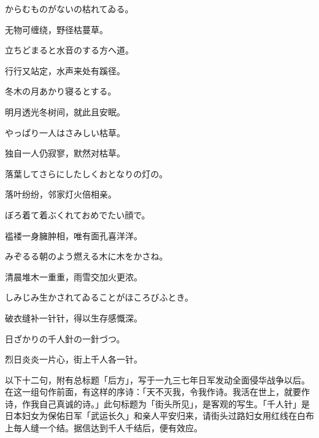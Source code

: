 \begin{haiku}
    {\FH からむものがないの枯れてゐる。}

    {\FK 无物可缠绕，野径枯蔓草。}
\end{haiku}

\begin{haiku}
    {\FH 立ちどまると水音のする方へ道。}

    {\FK 行行又站定，水声来处有蹊径。}
\end{haiku}

\begin{haiku}
    {\FH 冬木の月あかり寝るとする。}

    {\FK 明月透光冬树间，就此且安眠。}
\end{haiku}

\begin{haiku}
    {\FH やっぱり一人はさみしい枯草。}

    {\FK 独自一人仍寂寥，默然对枯草。}
\end{haiku}

\begin{haiku}
    {\FH 落葉してさらにしたしくおとなりの灯の。}

    {\FK 落叶纷纷，邻家灯火倍相亲。}
\end{haiku}

\begin{haiku}
    {\FH ぼろ着て着ぶくれておめでたい顔で。}

    {\FK 褴褛一身臃肿相，唯有面孔喜洋洋。}
\end{haiku}

\begin{haiku}
    {\FH みぞるる朝のよう燃える木に木をかさね。}

    {\FK 清晨堆木一重重，雨雪交加火更浓。}
\end{haiku}

\begin{haiku}
    {\FH しみじみ生かされてゐることがほころびふとき。}

    {\FK 破衣缝补一针针，得以生存感慨深。}
\end{haiku}

\begin{haiku}
    {\FH 日ざかりの千人針の一針づつ。}

    {\FK 烈日炎炎一片心，街上千人各一针。}

    {\FS 以下十二句，附有总标题「后方」，写于一九三七年日军发动全面侵华战争以后。在这一组句作前面，有这样的序诗：「天不灭我，令我作诗。我活在世上，就要作诗，作我自己真诚的诗。」此句标题为「街头所见」，是客观的写生。「千人针」是日本妇女为保佑日军「武运长久」和亲人平安归来，请街头过路妇女用红线在白布上毎人缝一个结。据信达到千人千结后，便有效应。}
\end{haiku}

